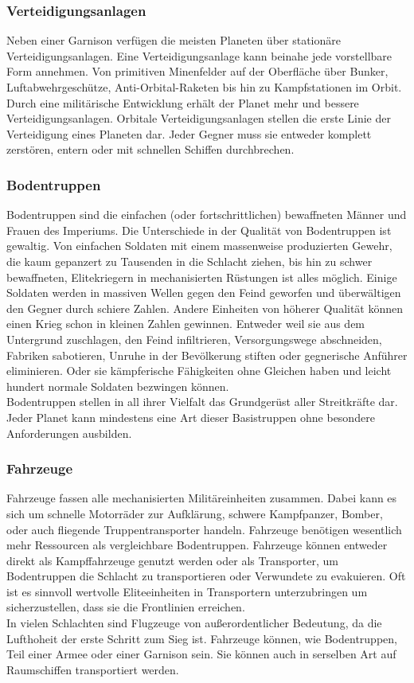 \documentclass[11pt, a4paper]{article}
\begin{document}
\subsubsection{Verteidigungsanlagen}
Neben einer Garnison verfügen die meisten Planeten über stationäre Verteidigungsanlagen. Eine
Verteidigungsanlage kann beinahe jede vorstellbare Form annehmen. Von primitiven Minenfelder auf der
Oberfläche über Bunker, Luftabwehrgeschütze, Anti-Orbital-Raketen bis hin zu Kampfstationen im Orbit.
Durch eine militärische Entwicklung erhält der Planet mehr und bessere Verteidigungsanlagen.
Orbitale Verteidigungsanlagen stellen die erste Linie der Verteidigung eines Planeten dar. Jeder Gegner muss
sie entweder komplett zerstören, entern oder mit schnellen Schiffen durchbrechen.
%
\subsubsection{Bodentruppen}
Bodentruppen sind die einfachen (oder fortschrittlichen) bewaffneten Männer und Frauen des Imperiums.
Die Unterschiede in der Qualität von Bodentruppen ist gewaltig. Von einfachen Soldaten mit einem massenweise
produzierten Gewehr, die kaum gepanzert zu Tausenden in die Schlacht ziehen, bis hin zu schwer bewaffneten,
Elitekriegern in mechanisierten Rüstungen ist alles möglich. Einige Soldaten werden in massiven Wellen gegen
den Feind geworfen und überwältigen den Gegner durch schiere Zahlen. Andere Einheiten von höherer Qualität
können einen Krieg schon in kleinen Zahlen gewinnen. Entweder weil sie aus dem Untergrund zuschlagen, den
Feind infiltrieren, Versorgungswege abschneiden, Fabriken sabotieren, Unruhe in der Bevölkerung stiften oder
gegnerische Anführer eliminieren. Oder sie kämpferische Fähigkeiten ohne Gleichen haben und leicht hundert
normale Soldaten bezwingen können.\\
Bodentruppen stellen in all ihrer Vielfalt das Grundgerüst aller Streitkräfte dar. Jeder Planet kann
mindestens eine Art dieser Basistruppen ohne besondere Anforderungen ausbilden.
%
\subsubsection{Fahrzeuge}
Fahrzeuge fassen alle mechanisierten Militäreinheiten zusammen. Dabei kann es sich um schnelle Motorräder zur
Aufklärung, schwere Kampfpanzer, Bomber, oder auch fliegende Truppentransporter handeln. Fahrzeuge benötigen
wesentlich mehr Ressourcen als vergleichbare Bodentruppen. Fahrzeuge können entweder direkt als Kampffahrzeuge
genutzt werden oder als Transporter, um Bodentruppen die Schlacht zu transportieren oder Verwundete zu
evakuieren. Oft ist es sinnvoll wertvolle Eliteeinheiten in Transportern unterzubringen um sicherzustellen,
dass sie die Frontlinien erreichen.\\
In vielen Schlachten sind Flugzeuge von außerordentlicher Bedeutung, da die Lufthoheit der erste Schritt zum
Sieg ist. Fahrzeuge können, wie Bodentruppen, Teil einer Armee oder einer Garnison sein. Sie können auch in
serselben Art auf Raumschiffen transportiert werden.
%
\end{document}
